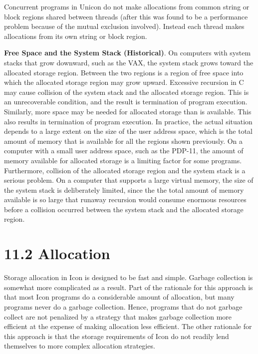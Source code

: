 {\color{blue}
Concurrent programs in Unicon do not make allocations from common string
or block regions shared between threads (after this was found to be a
performance problem because of the mutual exclusion involved). Instead
each thread makes allocations from its own string or block region.
}

\textbf{Free Space and the System Stack (Historical)}. On computers with system
stacks that grow downward, such as the VAX, the system stack grows
toward the allocated storage region. Between the two regions is a
region of free space into which the allocated storage region may grow
upward. Excessive recursion in C may cause collision of the system
stack and the allocated storage region. This is an unrecoverable
condition, and the result is termination of program execution.
Similarly, more space may be needed for allocated storage than is
available. This also results in termination of program execution. In
practice, the actual situation depends to a large extent on the size
of the user address space, which is the total amount of memory that is
available for all the regions shown previously. On a computer with a
small user address space, such as the PDP-11, the amount of memory
available for allocated storage is a limiting factor for some
programs. Furthermore, collision of the allocated storage region and
the system stack is a serious problem. On a computer that supports a
large virtual memory, the size of the system stack is deliberately
limited, since the the total amount of memory available is so large
that runaway recursion would consume enormous resources before a
collision occurred between the system stack and the allocated storage
region.

\section[11.2 Allocation]{11.2 Allocation}

Storage allocation in Icon is designed to be fast and simple. Garbage
collection is somewhat more complicated as a result. Part of the
rationale for this approach is that most Icon programs do a
considerable amount of allocation, but many programs never do a
garbage collection. Hence, programs that do not garbage collect are
not penalized by a strategy that makes garbage collection more
efficient at the expense of making allocation less efficient. The
other rationale for this approach is that the storage requirements of
Icon do not readily lend themselves to more complex allocation
strategies.

